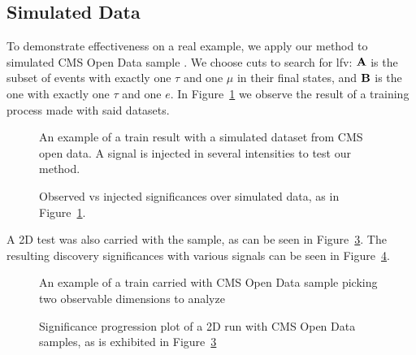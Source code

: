 \documentclass[paper/ddppaper2.tex]{subfiles}
\begin{document}
\subsection{Simulated Data}

To demonstrate effectiveness on a real example, we apply our method to simulated CMS Open Data sample \cite{CMS_OpenData_VVTo2L2Nu_2016}. We choose cuts to search for \gls{lfv}: ${\mathbf{A}}$ is the subset of events with exactly one $\tau$ and one $\mu$ in their final states, and ${\mathbf{B}}$ is the one with exactly one $\tau$ and one $e$. In Figure~\ref{fig:cms_open_data_train} we observe the result of a training process made with said datasets.

\begin{figure}
    \caption{An example of a train result with a simulated dataset from CMS open data. A signal is injected in several intensities to test our method.}
    \label{fig:cms_open_data_train}
\end{figure}

\begin{figure}
    \caption{Observed vs injected significances over simulated data, as in Figure~\ref{fig:cms_open_data_train}.}
    \label{fig:cms_open_data_significances}
\end{figure}

A 2D test was also carried with the sample, as can be seen in Figure~\ref{fig:cms_open_data_train_2d}. The resulting discovery significances with various signals can be seen in Figure~\ref{fig:cms_open_data_2d_significances}.

\begin{figure}
    \caption{An example of a train carried with CMS Open Data sample picking two observable dimensions to analyze}
    \label{fig:cms_open_data_train_2d}
\end{figure}

\begin{figure}
    \caption{Significance progression plot of a 2D run with CMS Open Data samples, as is exhibited in Figure~\ref{fig:cms_open_data_train_2d}}
    \label{fig:cms_open_data_2d_significances}
\end{figure}
\end{document}
